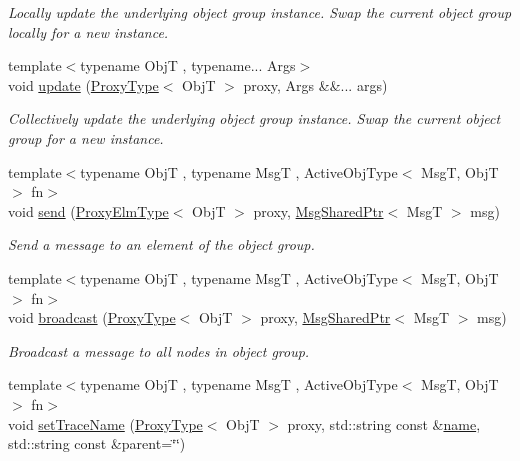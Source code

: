 \begin{DoxyCompactItemize}
\begin{DoxyCompactList}\small\item\em Locally update the underlying object group instance. Swap the current object group locally for a new instance. \end{DoxyCompactList}\item 
{\footnotesize template$<$typename ObjT , typename... Args$>$ }\\void \hyperlink{structvt_1_1objgroup_1_1_obj_group_manager_a36d8749cf4f42e6b912159e9b4f959d6}{update} (\hyperlink{structvt_1_1objgroup_1_1_obj_group_manager_aea65eef52f240a52210132eef5ce591f}{Proxy\+Type}$<$ ObjT $>$ proxy, Args \&\&... args)
\begin{DoxyCompactList}\small\item\em Collectively update the underlying object group instance. Swap the current object group for a new instance. \end{DoxyCompactList}\item 
{\footnotesize template$<$typename ObjT , typename MsgT , Active\+Obj\+Type$<$ Msg\+T, Obj\+T $>$ fn$>$ }\\void \hyperlink{structvt_1_1objgroup_1_1_obj_group_manager_a4b45c347778fda185d97b4c6af4ec58e}{send} (\hyperlink{structvt_1_1objgroup_1_1_obj_group_manager_adba6c8ecb0f4c30e719f1abb995cfc9b}{Proxy\+Elm\+Type}$<$ ObjT $>$ proxy, \hyperlink{namespacevt_ab2b3d506ec8e8d1540aede826d84a239}{Msg\+Shared\+Ptr}$<$ MsgT $>$ msg)
\begin{DoxyCompactList}\small\item\em Send a message to an element of the object group. \end{DoxyCompactList}\item 
{\footnotesize template$<$typename ObjT , typename MsgT , Active\+Obj\+Type$<$ Msg\+T, Obj\+T $>$ fn$>$ }\\void \hyperlink{structvt_1_1objgroup_1_1_obj_group_manager_a11a5b325363050d55b7428c84bcaa24b}{broadcast} (\hyperlink{structvt_1_1objgroup_1_1_obj_group_manager_aea65eef52f240a52210132eef5ce591f}{Proxy\+Type}$<$ ObjT $>$ proxy, \hyperlink{namespacevt_ab2b3d506ec8e8d1540aede826d84a239}{Msg\+Shared\+Ptr}$<$ MsgT $>$ msg)
\begin{DoxyCompactList}\small\item\em Broadcast a message to all nodes in object group. \end{DoxyCompactList}\item 
{\footnotesize template$<$typename ObjT , typename MsgT , Active\+Obj\+Type$<$ Msg\+T, Obj\+T $>$ fn$>$ }\\void \hyperlink{structvt_1_1objgroup_1_1_obj_group_manager_a922a82ded79fdefb5fd7de60bde77aad}{set\+Trace\+Name} (\hyperlink{structvt_1_1objgroup_1_1_obj_group_manager_aea65eef52f240a52210132eef5ce591f}{Proxy\+Type}$<$ ObjT $>$ proxy, std\+::string const \&\hyperlink{structvt_1_1objgroup_1_1_obj_group_manager_a92c0b07c2d90063c40087f625880cca3}{name}, std\+::string const \&parent=\char`\"{}\char`\"{})

\end{DoxyCompactItemize}
